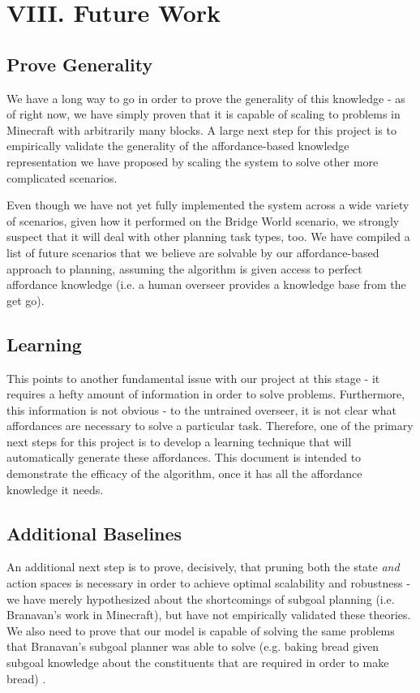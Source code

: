 \documentclass[a4paper]{article}
\begin{document}
\section{VIII. Future Work}
\subsection{Prove Generality}
We have a long way to go in order to prove the generality of this knowledge - as of right now, we have simply proven that it is capable of scaling to problems in Minecraft with arbitrarily many blocks. A large next step for this project is to empirically validate the generality of the affordance-based knowledge representation we have proposed by scaling the system to solve other more complicated scenarios.

Even though we have not yet fully implemented the system across a wide variety of scenarios, given how it performed on the Bridge World scenario, we strongly suspect that it will deal with other planning task types, too. We have compiled a list of future scenarios that we believe are solvable by our affordance-based approach to planning, assuming the algorithm is given access to perfect affordance knowledge (i.e. a human overseer provides a knowledge base from the get go).

\subsection{Learning}
This points to another fundamental issue with our project at this stage - it requires a hefty amount of information in order to solve problems. Furthermore, this information is not obvious - to the untrained overseer, it is not clear what affordances are necessary to solve a particular task. Therefore, one of the primary next steps for this project is to develop a learning technique that will automatically generate these affordances. This document is intended to demonstrate the efficacy of the algorithm, once it has all the affordance knowledge it needs.

\subsection{Additional Baselines}
An additional next step is to prove, decisively, that pruning both the state {\it and} action spaces is necessary in order to achieve optimal scalability and robustness - we have merely hypothesized about the shortcomings of subgoal planning (i.e. Branavan's work in Minecraft), but have not empirically validated these theories. We also need to prove that our model is capable of solving the same problems that Branavan's subgoal planner was able to solve (e.g. baking bread given subgoal knowledge about the constituents that are required in order to make bread) \cite{Branavan2012}.
\end{document}
